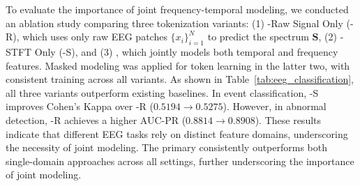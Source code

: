  To evaluate the importance of joint frequency-temporal modeling, we conducted an ablation study comparing three tokenization variants: (1) \method-Raw Signal Only (\method-R), which uses only raw EEG patches $\{x_i\}_{i=1}^N$ to predict the spectrum $\mathbf{S}$, (2) \method-STFT Only (\method-S), and (3) \method, which jointly models both temporal and frequency features. Masked modeling was applied for token learning in the latter two, with consistent \encoder training across all variants. As shown in Table~\ref{tab:eeg_classification}, all three variants outperform existing baselines. In event classification, \method-S improves Cohen’s Kappa over \method-R ($0.5194 \rightarrow 0.5275$). However, in abnormal detection, \method-R achieves a higher AUC-PR ($0.8814 \rightarrow 0.8908$). These results indicate that different EEG tasks rely on distinct feature domains, underscoring the necessity of joint modeling. The primary \method consistently outperforms both single-domain approaches across all settings, further underscoring the importance of joint modeling.



